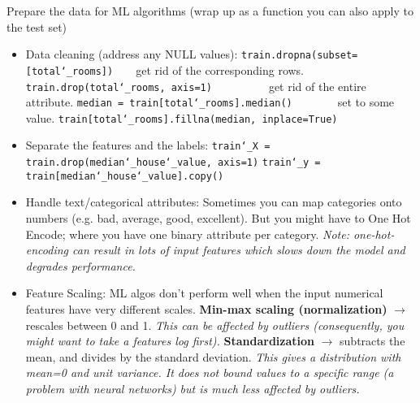 Prepare the data for ML algorithms (wrap up as a function you can also apply to the test set)
\vspace{-3.0mm}
\begin{itemize}
\item
Data cleaning (address any NULL values):\newline
\texttt{train.dropna(subset=[\textquotesingle total\char`_rooms\textquotesingle])}~~~~get rid of the corresponding rows.\newline
\texttt{train.drop(\textquotesingle total\char`_rooms\textquotesingle, axis=1)}~~~~~~~~~~get rid of the entire attribute.\newline
\texttt{median = train[\textquotesingle total\char`_rooms\textquotesingle].median()}~~~~~~~~set to some value.\newline
\texttt{train[\textquotesingle total\char`_rooms\textquotesingle].fillna(median, inplace=True)}
\item
Separate the features and the labels:\newline
\texttt{train\char`_X = train.drop(\textquotesingle median\char`_house\char`_value\textquotesingle, axis=1)}\newline
\texttt{train\char`_y = train[\textquotesingle median\char`_house\char`_value\textquotesingle].copy()}
\item
Handle text/categorical attributes:\newline
Sometimes you can map categories onto numbers (e.g. bad, average, good, excellent).\newline
But you might have to One Hot Encode;
where you have one binary attribute per category.\newline
\textit{Note: one-hot-encoding can result in lots of input features
which slows down the model and degrades performance.}
\item
Feature Scaling:\newline
ML algos don't perform well when the input numerical features have very different scales.
\textbf{Min-max scaling (normalization)} $\rightarrow$ rescales between 0 and 1.\newline
\textit{This can be affected by outliers (consequently, you might want to take a features log first).}\newline
\textbf{Standardization} $\rightarrow$ subtracts the mean, and divides by the standard deviation.\newline
\textit{This gives a distribution with mean=0 and unit variance.
It does not bound values to a specific range (a problem with neural networks)
but is much less affected by outliers.}\newline


\end{itemize}
